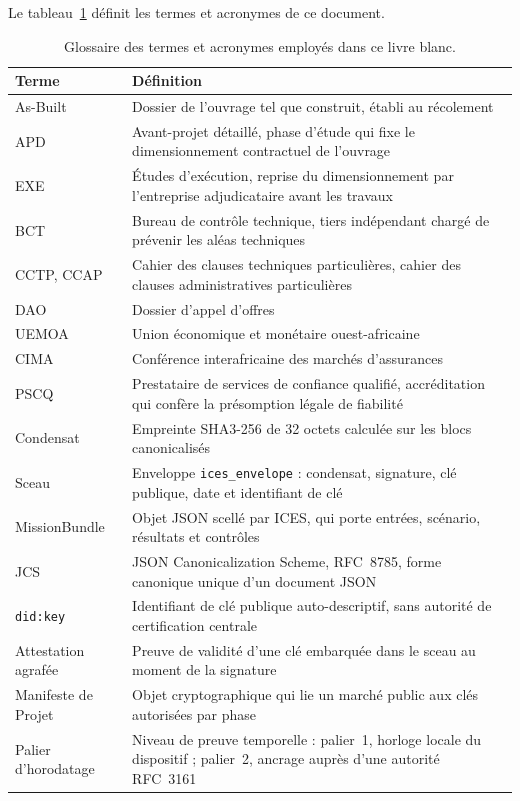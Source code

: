 \documentclass[11pt,a4paper]{article}
\begin{document}
Le tableau~\ref{tab:glossaire} définit les termes et acronymes de ce document.

\begin{table}[H]\centering\small
\caption{Glossaire des termes et acronymes employés dans ce livre blanc.}\label{tab:glossaire}
\begin{tabularx}{\linewidth}{@{}p{3.2cm}X@{}}
\toprule
\textbf{Terme} & \textbf{Définition} \\
\midrule
As-Built & Dossier de l'ouvrage tel que construit, établi au récolement \\
APD & Avant-projet détaillé, phase d'étude qui fixe le dimensionnement contractuel de l'ouvrage \\
EXE & Études d'exécution, reprise du dimensionnement par l'entreprise adjudicataire avant les travaux \\
BCT & Bureau de contrôle technique, tiers indépendant chargé de prévenir les aléas techniques \\
CCTP, CCAP & Cahier des clauses techniques particulières, cahier des clauses administratives particulières \\
DAO & Dossier d'appel d'offres \\
UEMOA & Union économique et monétaire ouest-africaine \\
CIMA & Conférence interafricaine des marchés d'assurances \\
PSCQ & Prestataire de services de confiance qualifié, accréditation qui confère la présomption légale de fiabilité \\
Condensat & Empreinte SHA3-256 de 32 octets calculée sur les blocs canonicalisés \\
Sceau & Enveloppe \texttt{ices\_envelope} : condensat, signature, clé publique, date et identifiant de clé \\
MissionBundle & Objet JSON scellé par ICES, qui porte entrées, scénario, résultats et contrôles \\
JCS & JSON Canonicalization Scheme, RFC~8785, forme canonique unique d'un document JSON \\
\texttt{did:key} & Identifiant de clé publique auto-descriptif, sans autorité de certification centrale \\
Attestation agrafée & Preuve de validité d'une clé embarquée dans le sceau au moment de la signature \\
Manifeste de Projet & Objet cryptographique qui lie un marché public aux clés autorisées par phase \\
Palier d'horodatage & Niveau de preuve temporelle : palier~1, horloge locale du dispositif ; palier~2, ancrage auprès d'une autorité RFC~3161 \\

\end{tabularx}
\end{table}
\end{document}
